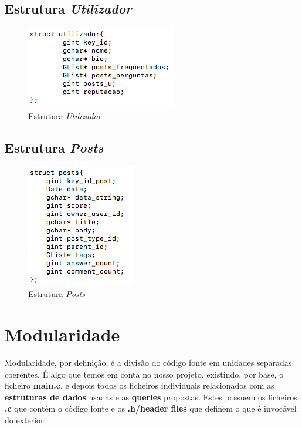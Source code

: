 \documentclass[a4paper]{article}
\begin{document}
\subsection{Estrutura \textit{Utilizador}}
\begin{figure}[ht]
\centering
\includegraphics[scale=0.50]{image_utilizador}
\caption{Estrutura \textit{Utilizador}}
\label{img:utilizador}
\end{figure}

\subsection{Estrutura \textit{Posts}}
\begin{figure}[ht]
\centering
\includegraphics[scale=0.50]{image_posts}
\caption{Estrutura \textit{Posts}}
\label{img:posts}
\end{figure}


\section{Modularidade}
\label{sec:modularidade}

Modularidade, por definição, é a divisão do código fonte em unidades 
separadas coerentes. É algo que temos em conta no nosso projeto,
existindo, por base, o ficheiro \textbf{main.c}, e depois todos os
ficheiros individuais relacionados com as \textbf{estruturas de dados}
usadas e as \textbf{queries} propostas. Estes possuem os ficheiros 
\textbf{.c} que contêm o código fonte e os \textbf{.h/header files} que
definem o que é invocável do exterior.
\end{document}
